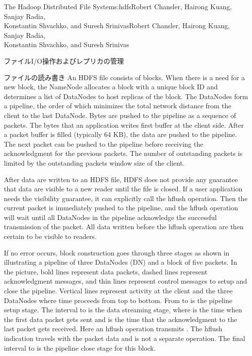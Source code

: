 \begin{aosachaptertoc}{The Hadoop Distributed File System}{s:hdfs}{Robert Chansler, Hairong Kuang, Sanjay Radia, \\ Konstantin Shvachko, and Suresh Srinivas}{Robert Chansler, Hairong Kuang, Sanjay Radia, \\ \hspace*{0.9cm} Konstantin Shvachko, and Suresh Srinivas}
\begin{aosasect1}{ファイルI/O操作およびレプリカの管理}
\begin{aosasect2}{ファイルの読み書き}
An HDFS file consists of blocks. When there is a need for a new block,
the NameNode allocates a block with a unique block ID and determines a
list of DataNodes to host replicas of the block.  The DataNodes form a
pipeline, the order of which minimizes the total network distance from
the client to the last DataNode. Bytes are pushed to the pipeline as a
sequence of packets. The bytes that an application writes first buffer
at the client side. After a packet buffer is filled (typically 64 KB),
the data are pushed to the pipeline. The next packet can be pushed to
the pipeline before receiving the acknowledgment for the previous
packets.  The number of outstanding packets is limited by the
outstanding packets window size of the client.

After data are written to an HDFS file, HDFS does not provide any
guarantee that data are visible to a new reader until the file is
closed. If a user application needs the visibility guarantee, it can
explicitly call the hflush operation. Then the current packet is
immediately pushed to the pipeline, and the hflush operation will wait
until all DataNodes in the pipeline acknowledge the successful
transmission of the packet. All data written before the hflush
operation are then certain to be visible to readers.


If no error occurs, block construction goes through three stages as
shown in  illustrating a pipeline of three
DataNodes (DN) and a block of five packets.  In the picture, bold
lines represent data packets, dashed lines represent acknowledgment
messages, and thin lines represent control messages to setup and close
the pipeline. Vertical lines represent activity at the client and the
three DataNodes where time proceeds from top to bottom.  From
 to  is the pipeline setup stage. The interval
 to  is the data streaming stage, where  is
the time when the first data packet gets sent and  is the
time that the acknowledgment to the last packet gets received. Here an
hflush operation transmits .  The hflush indication
travels with the packet data and is not a separate operation. The
final interval  to  is the pipeline close stage for
this block.


\end{aosasect2}
\end{aosasect1}
\end{aosachaptertoc}
